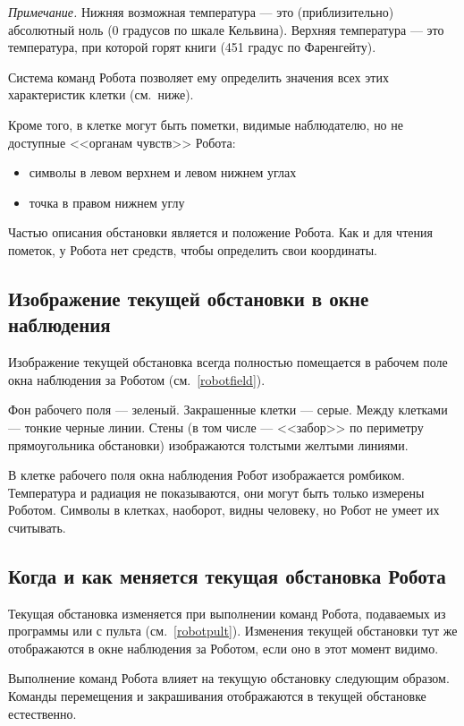 \documentclass[12pt,a4paper]{article}
\begin{document}
\emph{Примечание.} Нижняя возможная температура --- это (приблизительно) абсолютный ноль (0 градусов по шкале Кельвина). Верхняя температура --- это температура, при которой горят книги (451 градус по Фаренгейту).	

Система команд Робота позволяет ему определить значения всех этих характеристик клетки (см.~ниже).

Кроме того, в клетке могут быть пометки, видимые  наблюдателю, но не доступные <<органам чувств>> Робота:
\begin{itemize}
\item символы в левом верхнем и левом нижнем углах
\item точка в правом нижнем углу
\end{itemize}

Частью описания обстановки является и положение Робота. Как и для чтения пометок, у Робота нет средств, чтобы определить свои координаты.

\subsection{Изображение текущей обстановки в окне наблюдения}

Изображение текущей обстановка всегда полностью помещается в рабочем поле окна наблюдения за Роботом (см.~\ref{robotfield}).

Фон рабочего поля --- зеленый. Закрашенные клетки --- серые. Между клетками --- тонкие черные линии. Стены (в том числе --- <<забор>> по периметру прямоугольника обстановки) изображаются толстыми желтыми линиями.

В клетке рабочего поля окна наблюдения Робот изображается ромбиком. Температура и радиация не показываются, они могут быть только измерены Роботом. Символы в клетках, наоборот, видны человеку, но Робот не умеет их считывать.

\subsection{Когда и как меняется текущая обстановка Робота}

Текущая обстановка изменяется при выполнении команд Робота, подаваемых из программы или с пульта (см.~\ref{robotpult}). Изменения текущей обстановки тут же отображаются в окне наблюдения за Роботом, если оно в этот момент видимо.

Выполнение команд Робота влияет на текущую обстановку следующим образом. Команды перемещения и закрашивания отображаются в текущей обстановке естественно.
\end{document}
